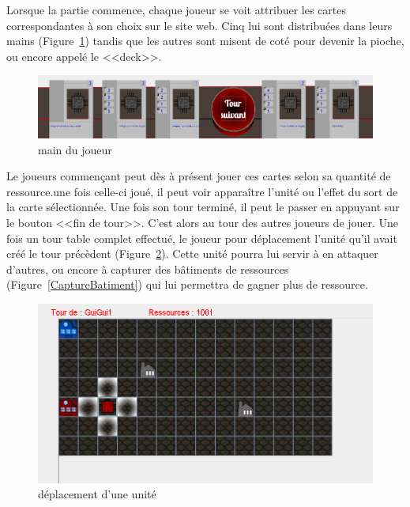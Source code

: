 \documentclass[a4paper, titlepage]{livret}
\begin{document}
	Lorsque la partie commence, chaque joueur se voit attribuer les cartes correspondantes à son choix sur le site web. Cinq lui sont distribuées dans leurs mains (Figure~\ref{cartesJoueur}) tandis que les autres sont misent de coté pour devenir la pioche, ou encore appelé le <<deck>>. 
	 \begin{figure}[th]	
	\begin{center}
	\includegraphics[scale=0.4]{Assets/mainJoueur.png} 
	\caption{main du joueur}
     \label{cartesJoueur}
      \end{center}
    \end{figure}


	
	 Le joueurs commençant peut dès à présent jouer ces cartes selon sa quantité de ressource.une fois celle-ci joué, il peut voir apparaître l'unité ou l'effet du sort de la carte sélectionnée. Une fois son tour terminé, il peut le passer en appuyant sur le bouton <<fin de tour>>. C'est alors au tour des autres joueurs de jouer. Une fois un tour table complet effectué, le joueur pour déplacement l'unité qu'il avait créé le tour précèdent (Figure~\ref{MouvementUnité}). Cette unité pourra lui servir à en attaquer d'autres, ou encore à capturer des bâtiments de ressources (Figure~\ref{CaptureBatiment}) qui lui permettra de gagner plus de ressource.
	 	
	 
	  \begin{figure}[th]
	 \begin{center}
	\includegraphics[scale=1]{Assets/UniteeSelectMove.png} 
	\caption{déplacement d'une unité}
     \label{MouvementUnité}
      \end{center}
    \end{figure}
\end{document}
